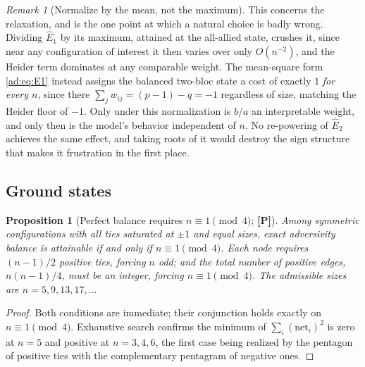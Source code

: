 \documentclass[11pt]{article}
\numberwithin{equation}{section}
\theoremstyle{plain}
\newtheorem{proposition}[theorem]{Proposition}
\theoremstyle{definition}
\theoremstyle{remark}
\newtheorem{remark}[theorem]{Remark}
\begin{document}
\begin{remark}[Normalize by the mean, not the maximum]
\label{ad:rem:normalisation}
This concerns the relaxation, and is the one point at which a natural
choice is badly wrong. Dividing $\hat E_1$ by its maximum, attained
at the all-allied state, crushes it, since near any configuration of interest it then varies over
only $O(n^{-2})$, and the Heider term dominates at any comparable
weight. The mean-square form \eqref{ad:eq:E1} instead assigns the
balanced two-bloc state a cost of exactly $1$ \emph{for every $n$},
since there $\sum_j w_{ij}=(p-1)-q=-1$ regardless of size, matching the
Heider floor of $-1$. Only under this normalization is $b/a$ an
interpretable weight, and only then is the model's behavior independent
of $n$. No re-powering of $\hat E_2$ achieves the same effect, and
taking roots of it would destroy the sign structure that makes it
frustration in the first place.
\end{remark}

\subsection{Ground states}\label{ad:sub:ground}

\begin{proposition}[Perfect balance requires $n\equiv1\pmod4$;
\textbf{[P]}]\label{ad:prop:congruence}
Among symmetric configurations with all ties saturated at $\pm1$ and
equal sizes, exact adversivity balance is attainable if and only if
$n\equiv1\pmod4$. Each node requires $(n-1)/2$ positive ties, forcing
$n$ odd; and the total number of positive edges, $n(n-1)/4$, must be an
integer, forcing $n\equiv1\pmod4$. The admissible sizes are
$n=5,9,13,17,\dots$
\end{proposition}

\begin{proof}
Both conditions are immediate; their conjunction holds exactly on
$n\equiv1\pmod4$. Exhaustive search confirms the minimum of
$\sum_i(\text{net}_i)^2$ is zero at $n=5$ and positive at
$n=3,4,6$, the first case being realized by the pentagon of positive
ties with the complementary pentagram of negative ones.
\end{proof}
\end{document}
